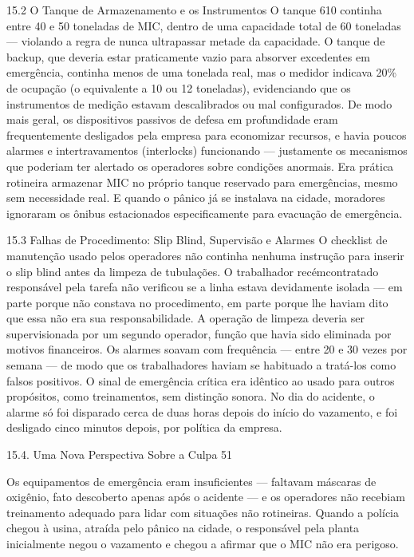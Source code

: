 15.2 O Tanque de Armazenamento e os Instrumentos O tanque 610 continha entre 40 e 50 toneladas de MIC, dentro de uma capacidade total de 60 toneladas — violando a regra de nunca ultrapassar metade da capacidade. O tanque de backup, que deveria estar praticamente vazio para absorver excedentes em emergência, continha menos de uma tonelada real, mas o medidor indicava 20\% de ocupação (o equivalente a 10 ou 12 toneladas), evidenciando que os instrumentos de medição estavam descalibrados ou mal configurados. De modo mais geral, os dispositivos passivos de defesa em profundidade eram frequentemente desligados pela empresa para economizar recursos, e havia poucos alarmes e intertravamentos (interlocks) funcionando — justamente os mecanismos que poderiam ter alertado os operadores sobre condições anormais. Era prática rotineira armazenar MIC no próprio tanque reservado para emergências, mesmo sem necessidade real. E quando o pânico já se instalava na cidade, moradores ignoraram os ônibus estacionados especificamente para evacuação de emergência.

15.3 Falhas de Procedimento: Slip Blind, Supervisão e Alarmes O checklist de manutenção usado pelos operadores não continha nenhuma instrução para inserir o slip blind antes da limpeza de tubulações. O trabalhador recémcontratado responsável pela tarefa não verificou se a linha estava devidamente isolada — em parte porque não constava no procedimento, em parte porque lhe haviam dito que essa não era sua responsabilidade. A operação de limpeza deveria ser supervisionada por um segundo operador, função que havia sido eliminada por motivos financeiros. Os alarmes soavam com frequência — entre 20 e 30 vezes por semana — de modo que os trabalhadores haviam se habituado a tratá-los como falsos positivos. O sinal de emergência crítica era idêntico ao usado para outros propósitos, como treinamentos, sem distinção sonora. No dia do acidente, o alarme só foi disparado cerca de duas horas depois do início do vazamento, e foi desligado cinco minutos depois, por política da empresa.

15.4. Uma Nova Perspectiva Sobre a Culpa 51

Os equipamentos de emergência eram insuficientes — faltavam máscaras de oxigênio, fato descoberto apenas após o acidente — e os operadores não recebiam treinamento adequado para lidar com situações não rotineiras. Quando a polícia chegou à usina, atraída pelo pânico na cidade, o responsável pela planta inicialmente negou o vazamento e chegou a afirmar que o MIC não era perigoso.

